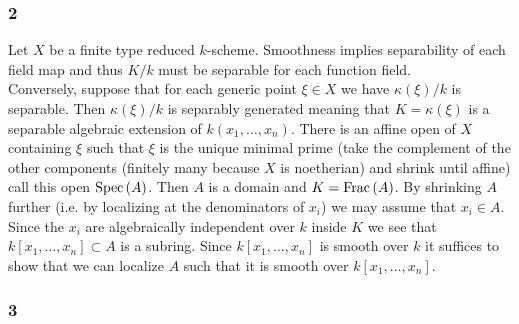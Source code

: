 \documentclass[12pt]{article}
\begin{document}
\subsubsection{2}

Let $X$ be a finite type reduced $k$-scheme. Smoothness implies separability of each field map and thus $K / k$ must be separable for each function field.
\bigskip\\
Conversely, suppose that for each generic point $\xi \in X$ we have $\kappa(\xi) / k$ is separable. Then $\kappa(\xi) / k$ is separably generated meaning that $K = \kappa(\xi)$ is a separable algebraic extension of $k(x_1, \dots, x_n)$. There is an affine open of $X$ containing $\xi$ such that $\xi$ is the unique minimal prime (take the complement of the other components (finitely many because $X$ is noetherian) and shrink until affine) call this open $\mathrm{Spec}\left( A \right)$. Then $A$ is a domain and $K = \mathrm{Frac}\left(A\right)$. By shrinking $A$ further (i.e. by localizing at the denominators of $x_i$) we may assume that $x_i \in A$. Since the $x_i$ are algebraically independent over $k$ inside $K$ we see that $k[x_1, \dots, x_n] \subset A$ is a subring. Since $k[x_1, \dots, x_n]$ is smooth over $k$ it suffices to show that we can localize $A$ such that it is smooth over $k[x_1, \dots, x_n]$. 


\subsubsection{3}
\end{document}
